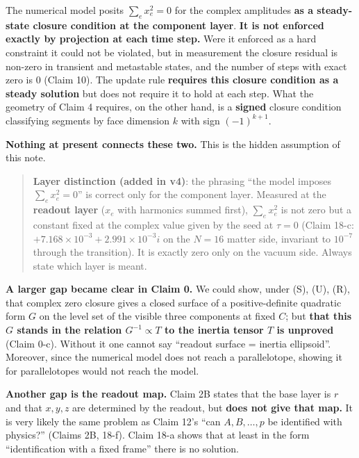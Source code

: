 \documentclass[
  10pt,
]{article}
\begin{document}
The numerical model posits \(\sum_e x_e^2 = 0\) for the complex
amplitudes \textbf{as a steady-state closure condition at the component
layer}. \textbf{It is not enforced exactly by projection at each time
step.} Were it enforced as a hard constraint it could not be violated,
but in measurement the closure residual is non-zero in transient and
metastable states, and the number of steps with exact zero is \(0\)
(Claim 10). The update rule \textbf{requires this closure condition as a
steady solution} but does not require it to hold at each step. What the
geometry of Claim 4 requires, on the other hand, is a \textbf{signed}
closure condition classifying segments by face dimension \(k\) with sign
\((-1)^{k+1}\).

\textbf{Nothing at present connects these two.} This is the hidden
assumption of this note.

\begin{quote}
\textbf{Layer distinction (added in v4)}: the phrasing ``the model
imposes \(\sum_e x_e^2 = 0\)'' is correct only for the component layer.
Measured at the \textbf{readout layer} (\(x_e\) with harmonics summed
first), \(\sum_e x_e^2\) is not zero but a constant fixed at the complex
value given by the seed at \(\tau=0\) (Claim 18-c:
\(+7.168\times10^{-3}+2.991\times10^{-3}i\) on the \(N=16\) matter side,
invariant to \(10^{-7}\) through the transition). It is exactly zero
only on the vacuum side. Always state which layer is meant.
\end{quote}

\textbf{A larger gap became clear in Claim 0.} We could show, under (S),
(U), (R), that complex zero closure gives a closed surface of a
positive-definite quadratic form \(G\) on the level set of the visible
three components at fixed \(C\); but \textbf{that this \(G\) stands in
the relation \(G^{-1}\propto T\) to the inertia tensor \(T\) is
unproved} (Claim 0-c). Without it one cannot say ``readout surface =
inertia ellipsoid''. Moreover, since the numerical model does not reach
a parallelotope, showing it for parallelotopes would not reach the
model.

\textbf{Another gap is the readout map.} Claim 2B states that the base
layer is \(r\) and that \(x,y,z\) are determined by the readout, but
\textbf{does not give that map.} It is very likely the same problem as
Claim 12's ``can \(A,B,\dots,p\) be identified with physics?'' (Claims
2B, 18-f). Claim 18-a shows that at least in the form ``identification
with a fixed frame'' there is no solution.
\end{document}
